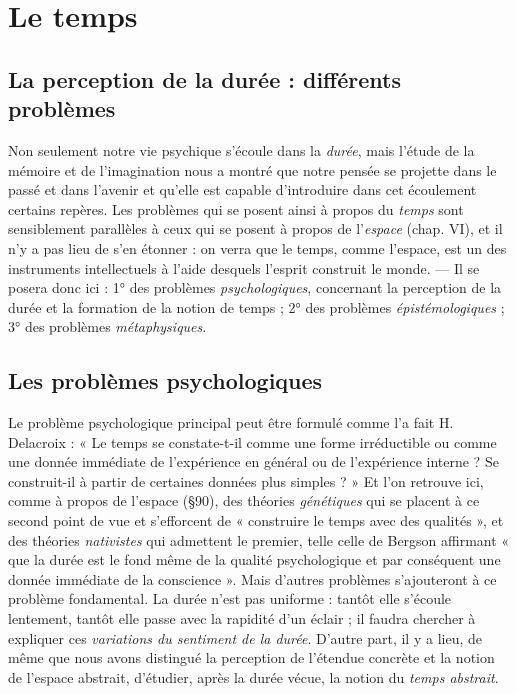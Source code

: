 \chapter{Le temps}

\section{La perception de la durée : différents problèmes}%
Non seulement notre vie psychique s’écoule dans la {\it durée}, mais
l'étude de la mémoire et de l’imagination nous a montré que notre
pensée se projette dans le passé et dans l’avenir et qu’elle est capable
d'introduire dans cet écoulement certains repères. Les problèmes qui
se posent ainsi à propos du {\it temps} sont sensiblement parallèles à
ceux qui se posent à propos de l’{\it espace} (chap. VI), et il n’y a pas lieu
de s’en étonner : on verra que le temps, comme l’espace, est un des
instruments intellectuels à l’aide desquels l’esprit construit le monde.
— Il se posera donc ici : 1° des problèmes {\it psychologiques}, concernant
la perception de la durée et la formation de la notion de temps ;
2° des problèmes {\it épistémologiques} ; 3° des problèmes {\it métaphysiques}.

\section{Les problèmes psychologiques}%
Le problème psychologique
principal peut être formulé comme l’a fait H. Delacroix :
« Le temps se constate-t-il comme une forme irréductible ou comme
une donnée immédiate de l’expérience en général ou de l’expérience
interne ? Se construit-il à partir de certaines données plus simples ? »
Et l’on retrouve ici, comme à propos de l’espace (\S 90), des théories
{\it génétiques} qui se placent à ce second point de vue et s’efforcent de
« construire le temps avec des qualités », et des théories {\it nativistes} qui
admettent le premier, telle celle de Bergson affirmant « que la durée
est le fond même de la qualité psychologique et par conséquent une
donnée immédiate de la conscience ». Mais d’autres problèmes s’ajouteront
à ce problème fondamental. La durée n’est pas uniforme :
tantôt elle s'écoule lentement, tantôt elle passe avec la rapidité d’un
éclair ; il faudra chercher à expliquer ces {\it variations du sentiment de la
durée}. D’autre part, il y a lieu, de même que nous avons distingué la
perception de l’étendue concrète et la notion de l’espace abstrait,
d'étudier, après la durée vécue, la notion du {\it temps abstrait}.

